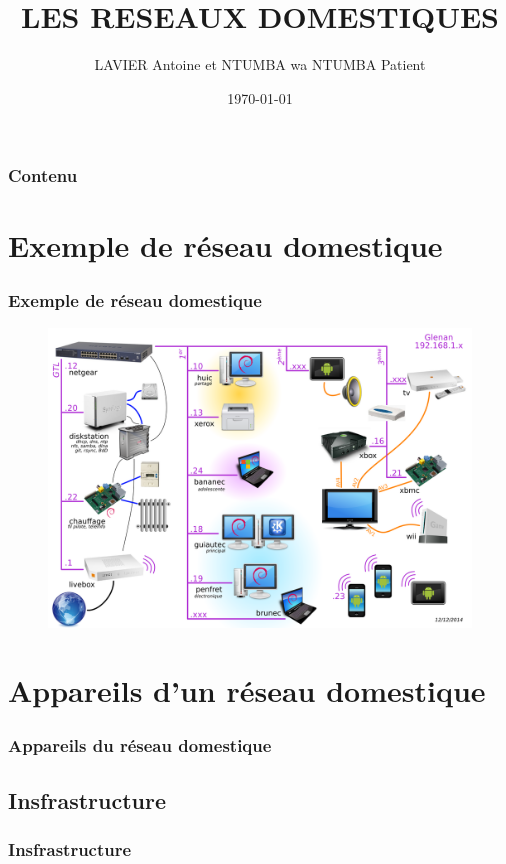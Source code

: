 \documentclass[handout]{beamer}
\begin{document}
\title{LES RESEAUX DOMESTIQUES}  
\author{LAVIER Antoine et NTUMBA wa NTUMBA Patient}
\date{\today} 

\begin{frame}
\titlepage
\end{frame} 

\begin{frame}
\frametitle{Contenu}
\tableofcontents
\end{frame} 


\section{Exemple de réseau domestique}
\begin{frame}\frametitle{Exemple de réseau domestique} 
\begin{figure}
		\centering
		\includegraphics[width=\textwidth,height=0.8\textheight,keepaspectratio]{image/LAN6.png}
\end{figure}
\end{frame}

\section{Appareils d'un réseau domestique}
\begin{frame}\frametitle{Appareils du réseau domestique} 
\end{frame}

\subsection{Insfrastructure}
\begin{frame}\frametitle{Insfrastructure} 
\end{frame}
\end{document}
